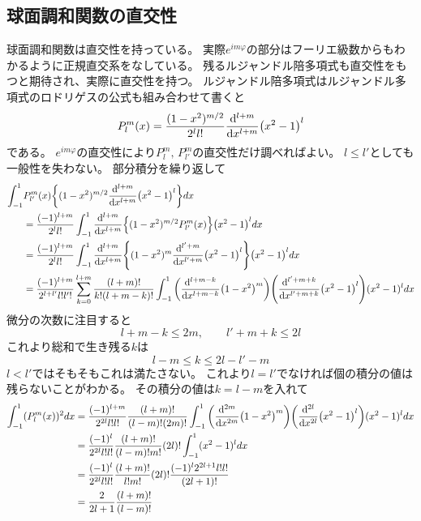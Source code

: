 \documentclass[../../master.tex]{subfiles}
\begin{document}
\subsection{球面調和関数の直交性}
球面調和関数は直交性を持っている。
実際\(e^{im\varphi}\)の部分はフーリエ級数からもわかるように正規直交系をなしている。
残るルジャンドル陪多項式も直交性をもつと期待され、実際に直交性を持つ。
ルジャンドル陪多項式はルジャンドル多項式のロドリゲスの公式も組み合わせて書くと
\begin{equation}
	P_l^m(x) = \frac{(1-x^2)^{m/2}}{2^l l!}\dv[l+m]{x}\qty(x^2-1)^l
\end{equation}
である。
\(e^{im\varphi}\)の直交性により\(P_l^m,\,P_{l'}^m\)の直交性だけ調べればよい。
\(l\leq l'\)としても一般性を失わない。
部分積分を繰り返して
\begin{equation}\begin{aligned}[b]
    \int_{-1}^{1} &P_{l'}^{m}(x)\qty{(1-x^2)^{m/2}\dv[l+m]{x}\qty(x^2-1)^l} dx \\
	&= \frac{(-1)^{l+m}}{2^l l!}\int_{-1}^{1} \dv[l+m]{x}\Bigl\{(1-x^2)^{m/2}P_{l'}^{m}(x)\Bigr\}\qty(x^2-1)^l dx\\
	&= \frac{(-1)^{l+m}}{2^l l!}\int_{-1}^{1} \dv[l+m]{x}\qty{(1-x^2)^{m}\dv[l'+m]{x}(x^2-1)^l}\qty(x^2-1)^l dx\\
	&= \frac{(-1)^{l+m}}{2^{l+l'} l!l'!}\sum_{k=0}^{l+m} \frac{(l+m)!}{k!(l+m-k)!}
	\int_{-1}^{1}\qty(\dv[l+m-k]{x}(1-x^2)^m)\qty(\dv[l'+m+k]{x}(x^2-1)^l)(x^2-1)^l dx
\end{aligned}\end{equation}
微分の次数に注目すると
\begin{equation}
	l+m-k \leq 2m,\qquad l'+m+k \leq 2l
\end{equation}
これより総和で生き残る\(k\)は
\begin{equation}
	l-m\leq k \leq 2l - l' -m
\end{equation}
\(l<l'\)ではそもそもこれは満たさない。
これより\(l=l'\)でなければ個の積分の値は残らないことがわかる。
その積分の値は\(k=l-m\)を入れて
\begin{equation}\begin{aligned}[b]
    \int_{-1}^{1} (P_l^m(x))^2 dx
	&=\frac{(-1)^{l+m}}{2^{2l}l!l!}\frac{(l+m)!}{(l-m)!(2m)!}
	\int_{-1}^{1}\qty(\dv[2m]{x}(1-x^2)^m)\qty(\dv[2l]{x}(x^2-1)^l)(x^2-1)^l dx\\
	&=\frac{(-1)^l}{2^{2l}l!l!}\frac{(l+m)!}{(l-m)!m!}(2l)!
	\int_{-1}^{1}(x^2-1)^l dx\\
	&=\frac{(-1)^l}{2^{2l}l!l!}\frac{(l+m)!}{l!m!}(2l)!\frac{(-1)^l2^{2l+1}l!l!}{(2l+1)!}\\
	&=\frac{2}{2l+1}\frac{(l+m)!}{(l-m)!}
\end{aligned}\end{equation}
\end{document}
